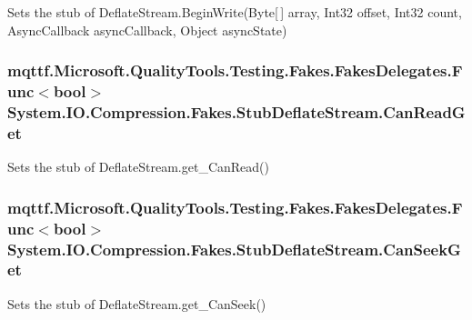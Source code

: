 Sets the stub of Deflate\-Stream.\-Begin\-Write(\-Byte\mbox{[}$\,$\mbox{]} array, Int32 offset, Int32 count, Async\-Callback async\-Callback, Object async\-State)

\hypertarget{class_system_1_1_i_o_1_1_compression_1_1_fakes_1_1_stub_deflate_stream_a57c9bdd3b54b63f5840b4586d97ea88e}{
\subsubsection[{Can\-Read\-Get}]{\setlength{\rightskip}{0pt plus 5cm}mqttf.\-Microsoft.\-Quality\-Tools.\-Testing.\-Fakes.\-Fakes\-Delegates.\-Func$<$bool$>$ System.\-I\-O.\-Compression.\-Fakes.\-Stub\-Deflate\-Stream.\-Can\-Read\-Get}}\label{class_system_1_1_i_o_1_1_compression_1_1_fakes_1_1_stub_deflate_stream_a57c9bdd3b54b63f5840b4586d97ea88e}


Sets the stub of Deflate\-Stream.\-get\-\_\-\-Can\-Read()

\hypertarget{class_system_1_1_i_o_1_1_compression_1_1_fakes_1_1_stub_deflate_stream_a260f9c1f7f095750f02e76872266ee18}{
\subsubsection[{Can\-Seek\-Get}]{\setlength{\rightskip}{0pt plus 5cm}mqttf.\-Microsoft.\-Quality\-Tools.\-Testing.\-Fakes.\-Fakes\-Delegates.\-Func$<$bool$>$ System.\-I\-O.\-Compression.\-Fakes.\-Stub\-Deflate\-Stream.\-Can\-Seek\-Get}}\label{class_system_1_1_i_o_1_1_compression_1_1_fakes_1_1_stub_deflate_stream_a260f9c1f7f095750f02e76872266ee18}


Sets the stub of Deflate\-Stream.\-get\-\_\-\-Can\-Seek()

